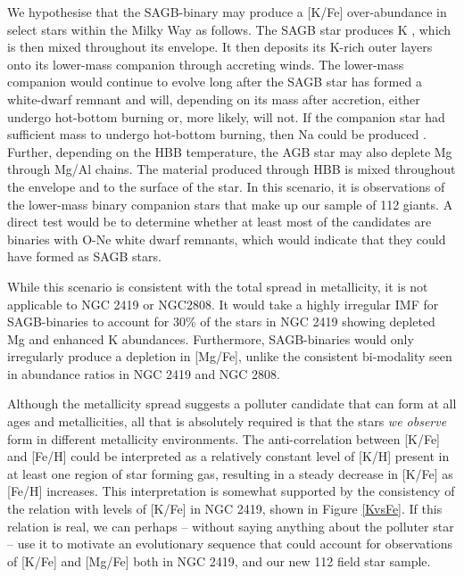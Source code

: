 \documentclass[a4paper,fleqn,usenatbib]{mnras}
\begin{document}
We hypothesise that the SAGB-binary may produce a [K/Fe] over-abundance in select stars within the Milky Way as follows. The SAGB star produces K \citep[destroying Na in the process;][]{prantzos2017}, which is then mixed throughout its envelope. It then deposits its K-rich outer layers onto its lower-mass companion through accreting winds. The lower-mass companion would continue to evolve long after the SAGB star has formed a white-dwarf remnant and will, depending on its mass after accretion, either undergo hot-bottom burning or, more likely, will not. If the companion star had sufficient mass to undergo hot-bottom burning, then Na could be produced \citep{prantzos2017}. Further, depending on the HBB temperature, the AGB star may also deplete Mg through Mg/Al chains. The material produced through HBB is mixed throughout the envelope and to the surface of the star. In this scenario, it is observations of the lower-mass binary companion stars that make up our sample of 112 giants. A direct test would be to determine whether at least most of the candidates are binaries with O-Ne white dwarf remnants, which would indicate that they could have formed as SAGB stars.

While this scenario is consistent with the total spread in metallicity, it is not applicable to NGC 2419 or NGC2808. It would take a highly irregular IMF for SAGB-binaries to account for 30\% of the stars in NGC 2419 showing depleted Mg and enhanced K abundances.  Furthermore, SAGB-binaries would only irregularly produce a depletion in [Mg/Fe], unlike the consistent bi-modality seen in abundance ratios in NGC 2419 and NGC 2808.

Although the metallicity spread suggests a polluter candidate that can form at all ages and metallicities, all that is absolutely required is that the stars \textit{we observe} form in different metallicity environments. The anti-correlation between [K/Fe] and [Fe/H] could be interpreted as a relatively constant level of [K/H] present in at least one region of star forming gas, resulting in a steady decrease in [K/Fe] as [Fe/H] increases. This interpretation is somewhat supported by the consistency of the relation with levels of [K/Fe] in NGC 2419, shown in Figure \ref{KvsFe}. If this relation is real, we can perhaps -- without saying anything about the polluter star -- use it to motivate an evolutionary sequence that could account for observations of [K/Fe] and [Mg/Fe] both in NGC 2419, and our new 112 field star sample.
\end{document}
